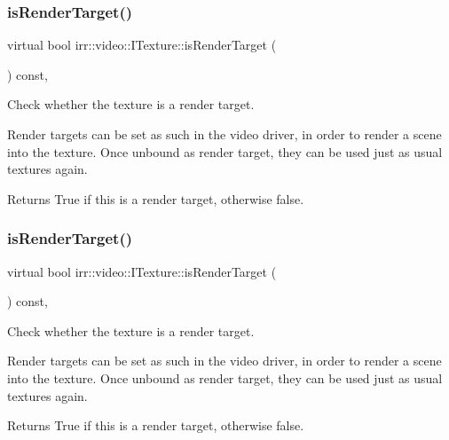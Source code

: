 \subsubsection{\texorpdfstring{is\+Render\+Target()}{isRenderTarget()}\hspace{0.1cm}{\footnotesize\ttfamily [1/2]}}
{\footnotesize\ttfamily virtual bool irr\+::video\+::\+I\+Texture\+::is\+Render\+Target (\begin{DoxyParamCaption}{ }\end{DoxyParamCaption}) const\hspace{0.3cm}{\ttfamily [inline]}, {\ttfamily [virtual]}}



Check whether the texture is a render target. 

Render targets can be set as such in the video driver, in order to render a scene into the texture. Once unbound as render target, they can be used just as usual textures again. \begin{DoxyReturn}{Returns}
True if this is a render target, otherwise false. 
\end{DoxyReturn}
\mbox{\label{classirr_1_1video_1_1ITexture_aac5c0e281e1aa49365fdb7e7fa4d7342}} 
\subsubsection{\texorpdfstring{is\+Render\+Target()}{isRenderTarget()}\hspace{0.1cm}{\footnotesize\ttfamily [2/2]}}
{\footnotesize\ttfamily virtual bool irr\+::video\+::\+I\+Texture\+::is\+Render\+Target (\begin{DoxyParamCaption}{ }\end{DoxyParamCaption}) const\hspace{0.3cm}{\ttfamily [inline]}, {\ttfamily [virtual]}}



Check whether the texture is a render target. 

Render targets can be set as such in the video driver, in order to render a scene into the texture. Once unbound as render target, they can be used just as usual textures again. \begin{DoxyReturn}{Returns}
True if this is a render target, otherwise false. 
\end{DoxyReturn}
\mbox{\label{classirr_1_1video_1_1ITexture_aa09ee89973a645ebdd2bd61ed859df38}} 
